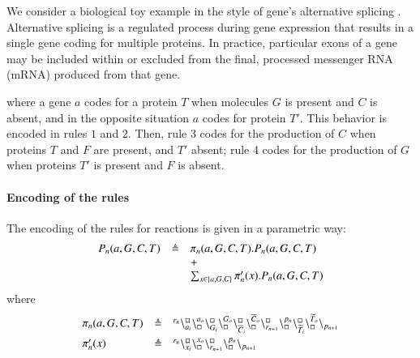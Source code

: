 \noindent
We consider a biological toy  example in the style of gene's alternative splicing \cite{WBB13}.
Alternative splicing is a regulated process during gene expression that results in a single gene 
coding for multiple proteins. 
In practice, particular exons of a gene may be included within or excluded from the final, 
processed messenger RNA (mRNA) produced from that gene.
 
where a gene $a$  codes for a protein $T$ when molecules 
$G$ is present and $C$ is absent, and in the opposite situation $a$ codes for protein $T'$.
This behavior is encoded in rules $1$ and $2$.
Then, rule 3 codes for the production of $C$ when proteins $T$ and $F$ are present, and $T'$ absent;
rule 4 codes for the production of $G$ when  proteins $T'$ is present and $F$ is absent.

\paragraph{Encoding of the rules}

The encoding of the rules for reactions is  given in a parametric way:
\[
\begin{array}{lcl}
P_n(a,G,C,T) & \triangleq &\pi_n(a,G,C,T).P_n(a,G,C,T)  \\
				&& +\\
			&&\sum_{x\in \{a,G,C\}} \pi'_n(x).P_n(a,G,C,T)
\end{array}
\]
where
\[
\begin{array}{lcl}
\pi_n(a,G,C,T) & \triangleq & {}^{r_n}\backslash_{a_i}^{\scriptstyle {\square}}\backslash_{\scriptstyle {\square}}^{a_o}
                                                    \backslash_{G_i}^{\scriptstyle {\square}}\backslash_{\scriptstyle {\square}}^{G_o}
                                                     \backslash_{\overline{C}_i}^{\scriptstyle {\square}}\backslash_{\scriptstyle {\square}}^{\overline{C}_o}
					        \backslash_{r_{n+1}}^{\scriptstyle {\square}}\backslash_{\scriptstyle {\square}}^{p_n}
					        \backslash_{\widetilde{T}_i}^{\scriptstyle {\square}}\backslash_{\scriptstyle {\square}}^{\widetilde{T}_o}
			\backslash_{p_{n+1}}\\[6pt]
\pi'_n(x) &\triangleq &  {}^{r_n}\backslash_{x_i}^{\scriptstyle {\square}}\backslash_{\scriptstyle {\square}}^{x_o}\backslash_{r_{n+1}}^{\scriptstyle {\square}}\backslash_{\scriptstyle {\square}}^{p_n} \backslash_{p_{n+1}} 
\end{array}
\]

